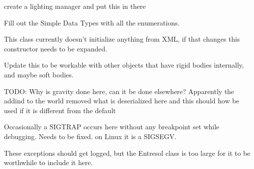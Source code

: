
\begin{DoxyRefList}
\item[\label{todo__todo000024}%
\hypertarget{todo__todo000024}{}%
Page \hyperlink{mainloop1}{Main Loop Structure and Flow} ]create a lighting manager and put this in there  
\item[\label{todo__todo000025}%
\hypertarget{todo__todo000025}{}%
page \hyperlink{index}{Mezzanine} ]Fill out the Simple Data Types with all the enumerations. 
\item[\label{todo__todo000001}%
\hypertarget{todo__todo000001}{}%
Member \hyperlink{classMezzanine_1_1ActorManager_af01011777296ba4f2768b6d41500923d}{Mezzanine\-:\-:Actor\-Manager\-:\-:Actor\-Manager} (X\-M\-L\-::\-Node \&X\-M\-L\-Node)]This class currently doesn't initialize anything from X\-M\-L, if that changes this constructor needs to be expanded.  
\item[\label{todo__todo000005}%
\hypertarget{todo__todo000005}{}%
Member \hyperlink{classMezzanine_1_1ActorRigid_a0290af701cc57b7bf2d8085e04841faf}{Mezzanine\-:\-:Actor\-Rigid\-:\-:\-\_\-\-Notify\-Collision\-State} (Physics\-::\-Collision $\ast$\-Col, const Physics\-::\-Collision\-::\-Collision\-State \&State)]Update this to be workable with other objects that have rigid bodies internally, and maybe soft bodies.  
\item[\label{todo__todo000006}%
\hypertarget{todo__todo000006}{}%
Member \hyperlink{classMezzanine_1_1ActorRigidDeSerializer_a43aa00f112ec13168a8369183099099f}{Mezzanine\-:\-:Actor\-Rigid\-De\-Serializer\-:\-:Proto\-De\-Serialize} (const X\-M\-L\-::\-Node \&One\-Node)]T\-O\-D\-O\-: Why is gravity done here, can it be done elsewhere? Apparently the addind to the world removed what is deserialized here and this should how be used if it is different from the default  
\item[\label{todo__todo000004}%
\hypertarget{todo__todo000004}{}%
Member \hyperlink{classMezzanine_1_1ActorRigidPhysicsSettings_a56d106b78dfa0ea5415c7928491e4fa7}{Mezzanine\-:\-:Actor\-Rigid\-Physics\-Settings\-:\-:$\sim$\-Actor\-Rigid\-Physics\-Settings} ()]Occasionally a S\-I\-G\-T\-R\-A\-P occurs here without any breakpoint set while debugging. Needs to be fixed. on Linux it is a S\-I\-G\-S\-E\-G\-V.  
\item[\label{todo__todo000007}%
\hypertarget{todo__todo000007}{}%
Member \hyperlink{classMezzanine_1_1Any_a80e0935053029b964ccc1f057600bc8f}{Mezzanine\-:\-:Any\-:\-:operator()} () const ]These exceptions should get logged, but the Entresol class is too large for it to be worthwhile to include it here.  

\end{DoxyRefList}

